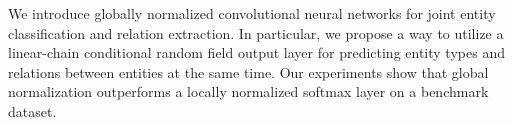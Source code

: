 We introduce globally normalized convolutional neural networks for joint entity classification and relation extraction. In particular, we propose a way to utilize a linear-chain conditional random field output layer for predicting entity types and relations between entities at the same time. Our experiments show that global normalization outperforms a locally normalized softmax layer on a benchmark dataset.
